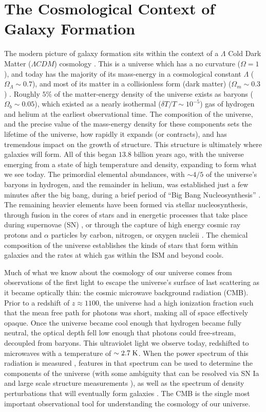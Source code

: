\section{The Cosmological Context of Galaxy Formation}
The modern picture of galaxy formation sits within the context of a $\Lambda$
Cold Dark Matter  ($\Lambda CDM$) cosmology
\citep{Rees1977,White1978,Blumenthal1984,Mo1998}.  This is a universe which has
a no curvature ($\Omega = 1$), and today has the majority of its mass-energy in
a cosmological constant $\Lambda$ ($\Omega_\Lambda \sim 0.7$), and most of its
matter in a collisionless form (dark matter) ($\Omega_m \sim 0.3$)
\citep{Planck2014}.  Roughly $5\%$ of the matter-energy density of the universe
exists as baryons ($\Omega_b \sim 0.05$), which existed as a nearly isothermal
($\delta T/T\sim10^{-5}$) gas of hydrogen and helium at the earliest
observational time.  The composition of the universe, and the precise value of
the mass-energy density for these components sets the lifetime of the universe,
how rapidly it expands (or contracts), and has tremendous impact on the growth
of structure.  This structure is ultimately where galaxies will form. All of
this began $13.8$ billion years ago, with the universe emerging from a state of
high temperature and density, expanding to form what we see today.  The
primordial elemental abundances, with $\sim4/5$ of the universe's baryons in
hydrogen, and the remainder in helium, was established just a few minutes after
the big bang, during a brief period of ``Big Bang Nucleosynthesis''
\citep{Alpher1948}.  The remaining heavier elements have been formed via stellar
nucleosynthesis, through fusion in the cores of stars and in energetic processes
that take place during supernovae (SN) \citep{Wagoner1967}, or through the
capture of high energy cosmic ray protons and $\alpha$ particles by carbon, nitrogen, or
oxygen nucleii \citep{Reeves1970}.  The chemical composition of the universe
establishes the kinds of stars that form within galaxies and the rates at which
gas within the ISM and beyond cools.

Much of what we know about the cosmology of our universe comes from observations
of the first light to escape the universe's surface of last scattering as it
became optically thin: the cosmic microwave background radiation (CMB).  Prior
to a redshift of $z\approx1100$, the universe had a high ionization fraction
such that the mean free path for photons was short, making all of space
effectively opaque.  Once the universe became cool enough that hydrogen became
fully neutral, the optical depth fell low enough that photons could free-stream,
decoupled from baryons.  This ultraviolet light we observe today, redshifted to
microwaves with a temperature of $\sim2.7\;\rm{K}$.  When the power spectrum of
this radiation is measured \citep{Spergel2003}, features in that spectrum can be
used to determine the components of the universe (with some ambiguity that can
be resolved via SN Ia and large scale structure measurements
\citealt{Riess1998,Perlmutter1999,Beutler2011,Blake2011}), as well as the
spectrum of density perturbations that will eventually form galaxies
\citep{Press1974,Peebles1980}.   The CMB is the single most important
observational tool for understanding the cosmology of our universe.

